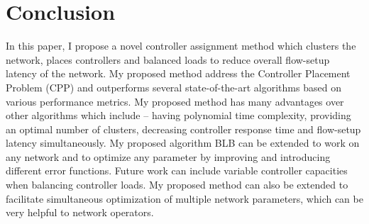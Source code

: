 \documentclass[preprint,12pt]{elsarticle}
\begin{document}
	\section{Conclusion} \label{conclusion}
	In this paper, I propose a novel controller assignment method which clusters the network, places controllers and balanced loads to reduce overall flow-setup latency of the network. My proposed method address the Controller Placement Problem (CPP) and outperforms several state-of-the-art algorithms based on various performance metrics. My proposed method has many advantages over other algorithms which include -- having polynomial time complexity, providing an optimal number of clusters, decreasing controller response time and flow-setup latency simultaneously. My proposed algorithm BLB can be extended to work on any network and to optimize any parameter by improving and introducing different error functions. Future work can include variable controller capacities when balancing controller loads. My proposed method can also be extended to facilitate simultaneous optimization of multiple network parameters, which can be very helpful to network operators.
	
	 
	
\end{document}
